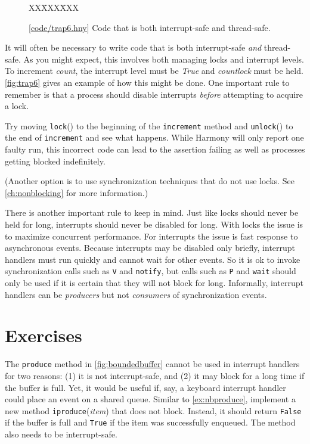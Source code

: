 \documentclass{report}
\newcommand{\harmonysource}[1]{
\begin{tabbing}
XX\=XXX\=XXX\kill
    
\end{tabbing}
}
\newcommand{\harmonylink}[1]{%
[\href{https://www.cs.cornell.edu/home/rvr/harmony/#1}{\underline{#1}}]%
}
\newenvironment{code}{
\tcolorbox
}{
\endtcolorbox
}
\begin{document}
\begin{figure}
\begin{code}
\harmonysource{trap6}
\end{code}
\caption{\harmonylink{code/trap6.hny} Code that is both interrupt-safe and thread-safe.}
\label{fig:trap6}
\end{figure}

It will often be necessary to write code that is both interrupt-safe \emph{and}
thread-safe.  As you might expect, this involves both managing locks and
interrupt levels.
To increment \textit{count}, the interrupt level must be \textit{True} and
\textit{countlock} must be held.
\autoref{fig:trap6} gives an example of how this might be done.
One important rule to remember is that a process should disable interrupts \emph{before}
attempting to acquire a lock.

Try moving \texttt{lock}() to the beginning of the \texttt{increment} method
and \texttt{unlock}() to the end of \texttt{increment} and see what happens.
While Harmony will only report one faulty run, this incorrect code can lead to
the assertion failing as well as processes getting blocked indefinitely.

(Another option is to use synchronization techniques that do not use locks.
See \autoref{ch:nonblocking} for more information.)

There is another important rule to keep in mind.  Just like locks should never be held
for long, interrupts should never be disabled for long.  With locks the issue is to
maximize concurrent performance.  For interrupts the issue is fast response to
asynchronous events.  Because interrupts may be disabled only briefly, interrupt
handlers must run quickly and cannot wait for other events.  So it is ok to invoke
synchronization calls such as \texttt{V} and \texttt{notify}, but calls such as
\texttt{P} and \texttt{wait} should only be used if it is certain that they will not
block for long.  Informally, interrupt handlers can be
\emph{producers} but not \emph{consumers} of synchronization events.

\section*{Exercises}
\begin{problems}
\item The \texttt{produce} method in \autoref{fig:boundedbuffer} cannot be used
in interrupt handlers for two reasons: (1) it is not interrupt-safe, and (2)
it may block for a long time if the buffer is full.  Yet, it would be useful if,
say, a keyboard interrupt handler could place an event on a shared queue.
Similar to \autoref{ex:nbproduce}, implement
a new method \texttt{iproduce}(\textit{item}) that does not
block.  Instead, it should return \texttt{False} if the buffer is full and \texttt{True}
if the item was successfully enqueued.
The method also needs to be interrupt-safe.
\end{problems}
\end{document}

